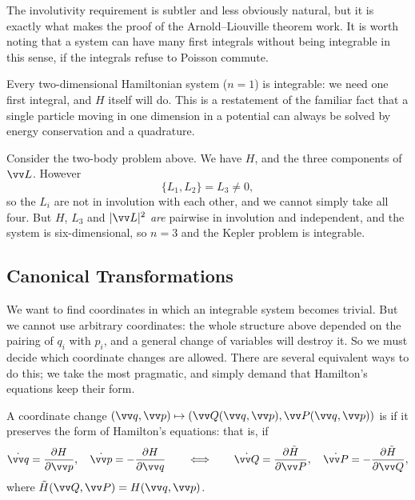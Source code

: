 The involutivity requirement is subtler and less obviously natural, but it is exactly what makes the proof of the Arnold--Liouville theorem work. It is worth noting that a system can have many first integrals without being integrable in this sense, if the integrals refuse to Poisson commute.

\begin{example}
	Every two-dimensional Hamiltonian system ($n = 1$) is integrable: we need one first integral, and $H$ itself will do. This is a restatement of the familiar fact that a single particle moving in one dimension in a potential can always be solved by energy conservation and a quadrature.
\end{example}

\begin{example}
	Consider the two-body problem above. We have $H$, and the three components of $\vv L$. However
	$$
	\{L_1, L_2\} = L_3 \neq 0,
	$$
	so the $L_i$ are not in involution with each other, and we cannot simply take all four. But $H$, $L_3$ and $|\vv L|^2$ \emph{are} pairwise in involution and independent, and the system is six-dimensional, so $n = 3$ and the Kepler problem is integrable.
\end{example}

\subsection{Canonical Transformations}

We want to find coordinates in which an integrable system becomes trivial. But we cannot use arbitrary coordinates: the whole structure above depended on the pairing of $q_i$ with $p_i$, and a general change of variables will destroy it. So we must decide which coordinate changes are allowed. There are several equivalent ways to do this; we take the most pragmatic, and simply demand that Hamilton's equations keep their form.

\begin{definition}
	A coordinate change $(\vv q, \vv p)\mapsto (\vv Q(\vv q, \vv p), \vv P(\vv q, \vv p))$ is  if it preserves the form of Hamilton's equations: that is, if
	$$
	\dot{\vv q} = \frac{\partial H}{\partial \vv p}, \quad \dot{\vv p} = -\frac{\partial H}{\partial \vv q}
	\qquad\Longleftrightarrow\qquad
	\dot{\vv Q} = \frac{\partial \tilde H}{\partial \vv P}, \quad \dot{\vv P} = -\frac{\partial \tilde H}{\partial \vv Q},
	$$
	where $\tilde H(\vv Q, \vv P) = H(\vv q, \vv p)$.
\end{definition}

